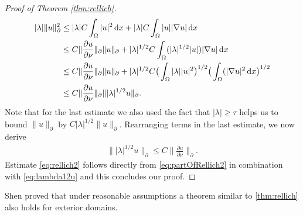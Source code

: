 \begin{proof}[Proof of Theorem \ref{thm:rellich}]
  \begin{align*}
    |\lambda| \|u\|_\partial^2 
    &\leq |\lambda| C \int_\Omega |u|^2 \, {\operatorname{d}\!{x}} + |\lambda| C \int_\Omega |u| |\nabla u| \, {\operatorname{d}\!{x}} \nonumber\\
    &\leq C \| \frac{\partial u}{\partial \nu} \|_\partial \|u\|_\partial + |\lambda|^{1/2} C \int_\Omega (|\lambda|^{1/2} |u|) |\nabla u| \, {\operatorname{d}\!{x}} \\
    &\leq C \|\frac{\partial u}{\partial \nu} \|_\partial \|u\|_\partial + |\lambda|^{1/2} C \big( \int_\Omega |\lambda| |u|^2 \big)^{1/2} \big( \int_\Omega (|\nabla u|^2 \, {\operatorname{d}\!{x}} \big)^{1/2} \\
    &\leq C \|\frac{\partial u}{\partial \nu} \|_\partial \||\lambda|^{1/2} u\|_\partial.
  \end{align*}
  Note that for the last estimate we also used the fact that $|\lambda| \geq \tau$ helps us to bound $\|u\|_\partial$ by $C |\lambda|^{1/2} \|u\|_\partial$.
  Rearranging terms in the last estimate, we now derive
  \begin{align}
    \label{eq:lambda12u}
    \| |\lambda|^{1/2} u\|_\partial \leq C \| \frac{\partial u}{\partial \nu} \|_\partial.
  \end{align}
  Estimate \eqref{eq:rellich2} follows directly from \eqref{eq:partOfRellich2} in combination with \eqref{eq:lambda12u} and this concludes our proof.
\end{proof}

Shen proved that under reasonable assumptions a theorem similar to \ref{thm:rellich} also holds for exterior domains.

